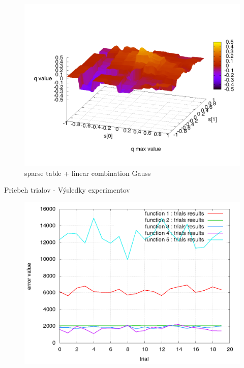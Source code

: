 \begin{figure}[!htb]
\centering
\includegraphics[scale=.4]{../../results_q_learning/map_1/function_type_3/iterations_10/q_learning_result.png}
\caption{sparse table + linear combination Gauss}
\end{figure}




Priebeh trialov - Výsledky experimentov

\begin{figure}[!htb]
\centering
\includegraphics[scale=.4]{../../results_q_learning/map_1/trials_average_results_progress.png}
\end{figure}




